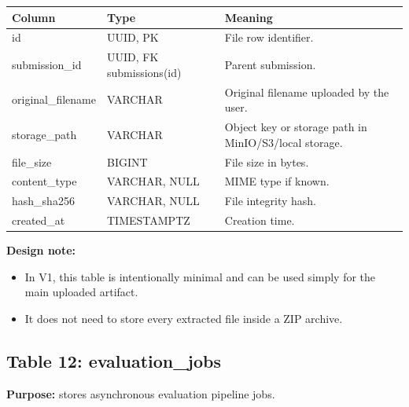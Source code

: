 \documentclass[11pt,a4paper]{article}
\begin{document}
\begin{longtable}{>{\raggedright\arraybackslash}p{} >{\raggedright\arraybackslash}p{} >{\raggedright\arraybackslash}p{}}
\toprule
\textbf{Column} & \textbf{Type} & \textbf{Meaning} \\
\midrule
id & UUID, PK & File row identifier. \\
submission\_id & UUID, FK submissions(id) & Parent submission. \\
original\_filename & VARCHAR & Original filename uploaded by the user. \\
storage\_path & VARCHAR & Object key or storage path in MinIO/S3/local storage. \\
file\_size & BIGINT & File size in bytes. \\
content\_type & VARCHAR, NULL & MIME type if known. \\
hash\_sha256 & VARCHAR, NULL & File integrity hash. \\
created\_at & TIMESTAMPTZ & Creation time. \\
\bottomrule
\end{longtable}

\textbf{Design note:}
\begin{itemize}
    \item In V1, this table is intentionally minimal and can be used simply for the main uploaded artifact.
    \item It does not need to store every extracted file inside a ZIP archive.
\end{itemize}

\subsection{Table 12: evaluation\_jobs}
\textbf{Purpose:} stores asynchronous evaluation pipeline jobs.
\end{document}
